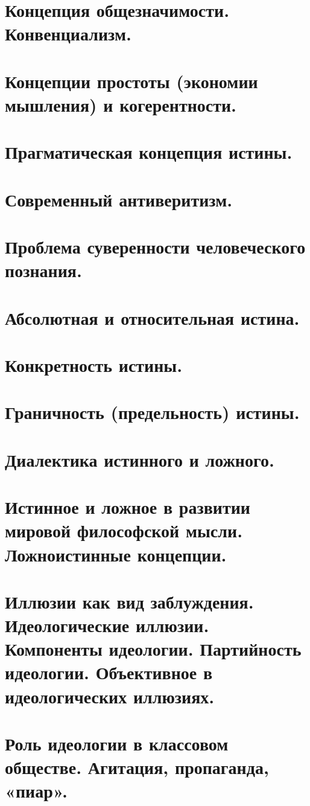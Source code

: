 \section{ Концепция общезначимости. Конвенциализм.}
\section{ Концепции простоты (экономии мышления) и когерентности.}
\section{ Прагматическая концепция истины.}
\section{ Современный антиверитизм.}
\section{ Проблема суверенности человеческого познания.}
\section{ Абсолютная и относительная истина.}
\section{ Конкретность истины.}
\section{ Граничность (предельность) истины.}
\section{ Диалектика истинного и ложного.}
\section{ Истинное и ложное в развитии мировой философской мысли. Ложноистинные концепции.}
\section{ Иллюзии как вид заблуждения. Идеологические иллюзии. Компоненты идеологии. Партийность идеологии. Объективное в идеологических иллюзиях.}
\section{ Роль идеологии в классовом обществе. Агитация, пропаганда, «пиар».}
